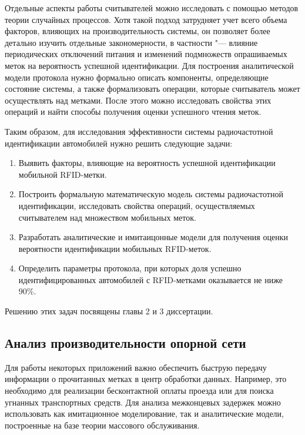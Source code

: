 Отдельные аспекты работы считывателей можно исследовать с помощью методов теории случайных процессов. Хотя такой подход затрудняет учет всего объема факторов, влияющих на производительность системы, он позволяет более детально изучить отдельные закономерности, в частности "--- влияние периодических отключений питания и изменений подмножеств опрашиваемых меток на вероятность успешной идентификации. Для построения аналитической модели протокола нужно формально описать компоненты, определяющие состояние системы, а также формализовать операции, которые считыватель может осуществлять над метками. После этого можно исследовать свойства этих операций и найти способы получения оценки успешного чтения меток.

Таким образом, для исследования эффективности системы радиочастотной идентификации автомобилей нужно решить следующие задачи:

\begin{enumerate}
    \item Выявить факторы, влияющие на вероятность успешной идентификации мобильной RFID-метки.
    \item Построить формальную математическую модель системы радиочастотной идентификации, исследовать свойства операций, осуществляемых считывателем над множеством мобильных меток.
    \item Разработать аналитические и имитаицонные модели для получения оценки вероятности идентификации мобильных RFID-меток.
    \item Определить параметры протокола, при которых доля успешно идентифицированных автомобилей с RFID-метками оказывается не ниже 90\%.
\end{enumerate}

Решению этих задач посвящены главы 2 и 3 диссертации.



\subsection{Анализ производительности опорной сети}

Для работы некоторых приложений важно обеспечить быструю передачу информации о прочитанных метках в центр обработки данных. Например, это необходимо для реализации бесконтактной оплаты проезда или для поиска угнанных транспортных средств. Для анализа межконцевых задержек можно использовать как имитационное моделирование, так и аналитические модели, построенные на базе теории массового обслуживания.

